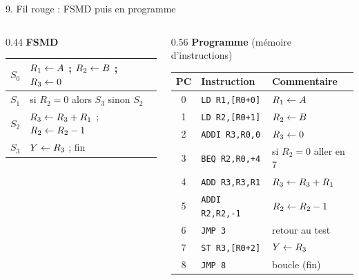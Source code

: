 \begin{frame}{9. Fil rouge : FSMD puis en programme}
\begin{columns}[T]
\begin{column}{0.44\textwidth}
\centering\footnotesize\textbf{FSMD}\par\vspace{1mm}
\scriptsize
\renewcommand{\arraystretch}{1.5}
\begin{tabular}{|c|l|}
\hline
\rowcolor{\cS} $S_0$ & $R_1 \leftarrow A$ ;\; $R_2 \leftarrow B$ ;\; $R_3 \leftarrow 0$ \\ \hline
\rowcolor{\cT} $S_1$ & si $R_2 = 0$ alors $S_3$ sinon $S_2$ \\ \hline
\rowcolor{\cU} $S_2$ & $R_3 \leftarrow R_3 + R_1$ ;\; $R_2 \leftarrow R_2 - 1$ \\ \hline
\rowcolor{\cV} $S_3$ & $Y \leftarrow R_3$ ;\; fin \\ \hline
\end{tabular}
\end{column}
\begin{column}{0.56\textwidth}
\centering\footnotesize\textbf{Programme} (mémoire d'instructions)\par\vspace{1mm}
\scriptsize
\renewcommand{\arraystretch}{1.1}
\begin{tabular}{|c|l|l|}
\hline
\textbf{PC} & \textbf{Instruction} & \textbf{Commentaire} \\ \hline
\rowcolor{\cS} 0 & \texttt{LD R1,[R0+0]} & $R_1 \leftarrow A$ \\
\rowcolor{\cS} 1 & \texttt{LD R2,[R0+1]} & $R_2 \leftarrow B$ \\
\rowcolor{\cS} 2 & \texttt{ADDI R3,R0,0} & $R_3 \leftarrow 0$ \\ \hline
\rowcolor{\cT} 3 & \texttt{BEQ R2,R0,+4} & si $R_2=0$ aller en 7 \\ \hline
\rowcolor{\cU} 4 & \texttt{ADD R3,R3,R1} & $R_3 \leftarrow R_3+R_1$ \\
\rowcolor{\cU} 5 & \texttt{ADDI R2,R2,-1} & $R_2 \leftarrow R_2-1$ \\
\rowcolor{\cU} 6 & \texttt{JMP 3} & retour au test \\ \hline
\rowcolor{\cV} 7 & \texttt{ST R3,[R0+2]} & $Y \leftarrow R_3$ \\
\rowcolor{\cV} 8 & \texttt{JMP 8} & boucle (fin) \\ \hline
\end{tabular}
\end{column}
\end{columns}


\end{frame}

